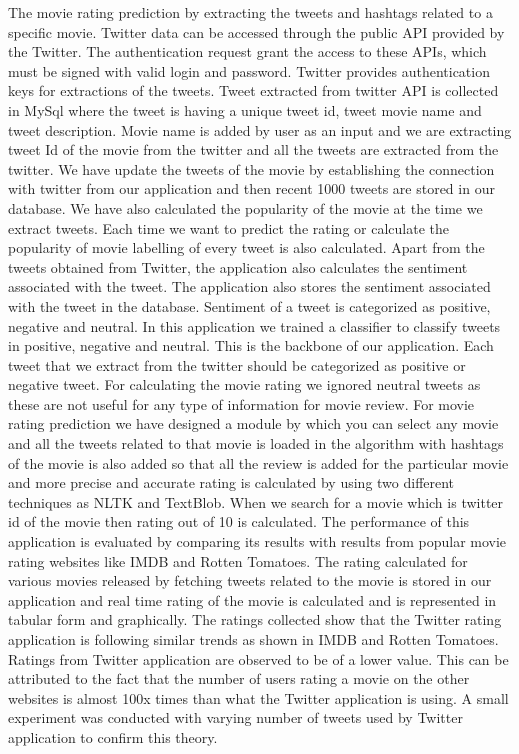 \documentclass[a4paper]{article}
\begin{document}
The movie rating prediction by extracting the tweets and hashtags related to a specific movie. Twitter data can be accessed through the public API provided by the Twitter. The authentication request grant the access to these APIs, which must be signed with valid login and password. Twitter provides authentication keys for extractions of the tweets.
Tweet extracted from twitter API is collected in MySql where the tweet is having a unique tweet id, tweet movie name and tweet description. Movie name is added by user as an input and we are extracting tweet Id of the movie from the twitter and all the tweets are extracted from the twitter. We have update the tweets of the movie by establishing the connection with twitter from our application and then recent 1000 tweets are stored in our database. We have also calculated the popularity of the movie at the time we extract tweets. Each time we want to predict the rating or calculate the popularity of movie labelling of every tweet is also calculated. Apart from the tweets obtained from Twitter, the application also calculates the sentiment associated with the tweet. The application also stores the sentiment associated with the tweet in the database. Sentiment of a tweet is categorized as positive, negative and neutral. In this application we trained a classifier to classify tweets in positive, negative and neutral. This is the backbone of our application. Each tweet that we extract from the twitter should be categorized as positive or negative tweet. For calculating the movie rating we ignored neutral tweets as these are not useful for any type of information for movie review. For movie rating prediction we have designed a module by which you can select any movie and all the tweets related to that movie is loaded in the algorithm with hashtags of the movie is also added so that all the review is added for the particular movie and more precise and accurate rating is calculated by using two different techniques as NLTK and TextBlob. When we search for a movie which is twitter id of the movie then rating out of 10 is calculated.
The performance of this application is evaluated by comparing its results with results from popular movie rating websites like IMDB and Rotten Tomatoes. The rating calculated for various movies released by fetching tweets related to the movie is stored in our application and real time rating of the movie is calculated and is represented in tabular form and graphically. The ratings collected show that the Twitter rating application is following similar trends as shown in IMDB and Rotten Tomatoes. Ratings from Twitter application are observed to be of a lower value. This can be attributed to the fact that the number of users rating a movie on the other websites is almost 100x times than what the Twitter application is using. A small experiment was conducted with varying number of tweets used by Twitter application to confirm this theory.
\end{document}
